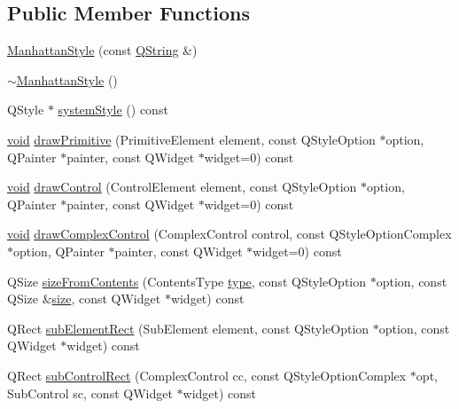 \subsection*{Public Member Functions}
\begin{DoxyCompactItemize}
\item 
\hyperlink{group___core_plugin_ga4b21c0e4e089ae1e7393ef1349a47d36}{Manhattan\-Style} (const \hyperlink{group___u_a_v_objects_plugin_gab9d252f49c333c94a72f97ce3105a32d}{Q\-String} \&)
\item 
\hyperlink{group___core_plugin_ga6b9736a4e80d76843fcc68abaf59d38a}{$\sim$\-Manhattan\-Style} ()
\item 
Q\-Style $\ast$ \hyperlink{group___core_plugin_ga2ee8bb8626f313a1dc3b9c161d3e5321}{system\-Style} () const 
\item 
\hyperlink{group___u_a_v_objects_plugin_ga444cf2ff3f0ecbe028adce838d373f5c}{void} \hyperlink{group___core_plugin_ga05806a092b021a7b82a266b563ebe921}{draw\-Primitive} (Primitive\-Element element, const Q\-Style\-Option $\ast$option, Q\-Painter $\ast$painter, const Q\-Widget $\ast$widget=0) const 
\item 
\hyperlink{group___u_a_v_objects_plugin_ga444cf2ff3f0ecbe028adce838d373f5c}{void} \hyperlink{group___core_plugin_ga535d0da17b1de8f4aead3234031bc4e9}{draw\-Control} (Control\-Element element, const Q\-Style\-Option $\ast$option, Q\-Painter $\ast$painter, const Q\-Widget $\ast$widget=0) const 
\item 
\hyperlink{group___u_a_v_objects_plugin_ga444cf2ff3f0ecbe028adce838d373f5c}{void} \hyperlink{group___core_plugin_ga62de2c676daa999f53f69bff30ebbf4c}{draw\-Complex\-Control} (Complex\-Control control, const Q\-Style\-Option\-Complex $\ast$option, Q\-Painter $\ast$painter, const Q\-Widget $\ast$widget=0) const 
\item 
Q\-Size \hyperlink{group___core_plugin_gae73b65e8a877259659ebe19fd11969e6}{size\-From\-Contents} (Contents\-Type \hyperlink{glext_8h_a7d05960f4f1c1b11f3177dc963a45d86}{type}, const Q\-Style\-Option $\ast$option, const Q\-Size \&\hyperlink{glext_8h_a014d89bd76f74ef3a29c8f04b473eb76}{size}, const Q\-Widget $\ast$widget) const 
\item 
Q\-Rect \hyperlink{group___core_plugin_ga5263b6ad64fb081f45d6a1c9553492dd}{sub\-Element\-Rect} (Sub\-Element element, const Q\-Style\-Option $\ast$option, const Q\-Widget $\ast$widget) const 
\item 
Q\-Rect \hyperlink{group___core_plugin_ga50a13d81cf4a2ccf6f94f68ce6f9f069}{sub\-Control\-Rect} (Complex\-Control cc, const Q\-Style\-Option\-Complex $\ast$opt, Sub\-Control sc, const Q\-Widget $\ast$widget) const 

\end{DoxyCompactItemize}
